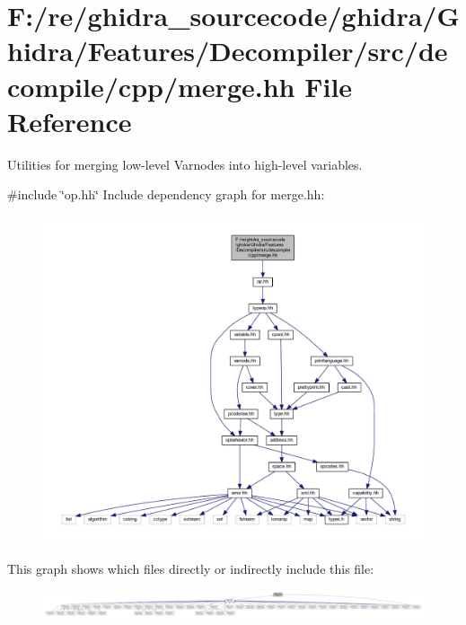 \hypertarget{merge_8hh}{}\section{F\+:/re/ghidra\+\_\+sourcecode/ghidra/\+Ghidra/\+Features/\+Decompiler/src/decompile/cpp/merge.hh File Reference}
\label{merge_8hh}


Utilities for merging low-\/level Varnodes into high-\/level variables.  


{\ttfamily \#include \char`\"{}op.\+hh\char`\"{}}\newline
Include dependency graph for merge.\+hh\+:
\nopagebreak
\begin{figure}[H]
\begin{center}
\leavevmode
\includegraphics[width=350pt]{merge_8hh__incl}
\end{center}
\end{figure}
This graph shows which files directly or indirectly include this file\+:
\nopagebreak
\begin{figure}[H]
\begin{center}
\leavevmode
\includegraphics[width=350pt]{merge_8hh__dep__incl}
\end{center}
\end{figure}
